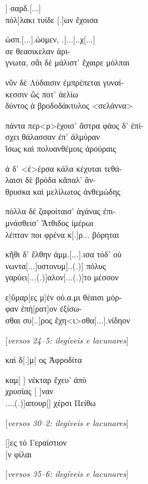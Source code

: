 \begin{gkverse}
] σαρδ.[...]\\
     πόλ]λακι τυίδε [.]ων ἔχοισα

ὠσπ.[...].ώομεν, .[...]..χ[...]\\
    σε \dagger{}θεασικελαν ἀρι-\\
      γνωτα\dagger{}, σᾶι δὲ μάλιστ’ ἔχαιρε μόλπαι

νῦν δὲ Λύδαισιν ἐμπρέπεται γυναί-\\
    κεσσιν ὤς ποτ’ ἀελίω\\
      δύντος ἀ βροδοδάκτυλος <σελάννα>

πάντα περ<ρ>έχοισ’ ἄστρα φάος δ’ ἐπί-\\
    σχει θάλασσαν ἐπ’ ἀλμύραν\\
      ἴσως καὶ πολυανθέμοις ἀρούραις

ἀ δ’ <ἐ>έρσα κάλα κέχυται τεθά-\\
    λαισι δὲ βρόδα κἄπαλ’ ἄν-\\
      θρυσκα καὶ μελίλωτος ἀνθεμώδης 

πόλλα δὲ ζαφοίταισ’ ἀγάνας ἐπι-\\
    μνάσθεισ’ Ἄτθιδος ἰμέρωι\\
      λέπταν ποι φρένα κ[.]ρ... βόρηται

κῆθι δ’ ἔλθην ἀμμ.[...].ισα τόδ’ οὐ\\
    νωντα[...]υστονυμ[..(.)] πόλυς\\
      γαρύει[...(.)]αλον[...(.)]το μέσσον

ε]ὔμαρ[ες μ]ὲν οὐ.α.μι θέαισι μόρ-\\
    φαν ἐπή[ρατ]ον ἐξίσω-\\
      σθαι συ[..]ρος ἔχη<ι>σθα[...].νίδηον

\textnormal{[\textit{versos 24--5: ilegíveis e lacunares}]}

      καὶ δ[.]μ{[}	\qquad		{]}ος Ἀφροδίτα

καμ[		\qquad	] νέκταρ ἔχευ’ ἀπὺ\\
    χρυσίας [		       ]ναν\\
      ....(.)]απουρ[\qquad		] χέρσι Πείθω

\textnormal{[\textit{versos 30--2: ilegíveis e lacunares}]}

[\qquad			]ες τὸ Γεραίστιον\\
    {[}\qquad			   {]}ν φίλαι

\textnormal{[\textit{versos 35--6: ilegíveis e lacunares}]}
\end{gkverse}


